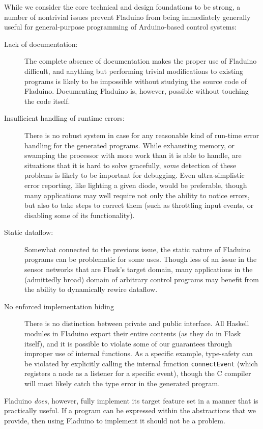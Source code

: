 \documentclass[a4paper, oneside, final]{memoir}
\begin{document}
While we consider the core technical and design foundations to be
strong, a number of nontrivial issues prevent Fladuino from being
immediately generally useful for general-purpose programming of
Arduino-based control systems:

\begin{description}
\item[Lack of documentation:] The complete absence of documentation
  makes the proper use of Fladuino difficult, and anything but
  performing trivial modifications to existing programs is likely to
  be impossible without studying the source code of Fladuino.
  Documenting Fladuino is, however, possible without touching the code
  itself.
\item[Insufficient handling of runtime errors:] There is no robust
  system in case for any reasonable kind of run-time error handling
  for the generated programs.  While exhausting memory, or swamping
  the processor with more work than it is able to handle, are
  situations that it is hard to solve gracefully, \textit{some}
  detection of these problems is likely to be important for debugging.
  Even ultra-simplistic error reporting, like lighting a given diode,
  would be preferable, though many applications may well require not
  only the ability to notice errors, but also to take steps to correct
  them (such as throttling input events, or disabling some of its
  functionality).
\item[Static dataflow:] Somewhat connected to the previous issue, the
  static nature of Fladuino programs can be problematic for some uses.
  Though less of an issue in the sensor networks that are Flask's
  target domain, many applications in the (admittedly broad) domain of
  arbitrary control programs may benefit from the ability to
  dynamically rewire dataflow.
\item[No enforced implementation hiding] There is no distinction
  between private and public interface.  All Haskell modules in
  Fladuino export their entire contents (as they do in Flask itself),
  and it is possible to violate some of our guarantees through
  improper use of internal functions.  As a specific example,
  type-safety can be violated by explicitly calling the internal
  function \texttt{connectEvent} (which registers a node as a listener
  for a specific event), though the C compiler will most likely catch
  the type error in the generated program.
\end{description}

Fladuino \textit{does}, however, fully implement its target feature
set in a manner that is practically useful.  If a program can be
expressed within the abstractions that we provide, then using Fladuino
to implement it should not be a problem.
\end{document}
